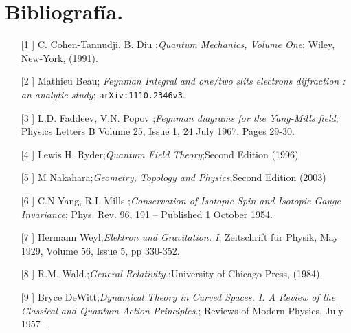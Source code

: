 \chapter{Bibliografía.}
\begin{itemize}
\item[[1]] C. Cohen-Tannudji, B. Diu ;\textit{Quantum Mechanics, Volume One}; Wiley, New-York, (1991).
\item[[2]] Mathieu Beau; \textit{Feynman Integral and one/two slits electrons diffraction : an analytic study}; \texttt{arXiv:1110.2346v3}.
\item[[3]]  L.D. Faddeev,  V.N. Popov ;\textit{Feynman diagrams for the Yang-Mills field}; Physics Letters B Volume 25, Issue 1, 24 July 1967, Pages 29-30.
\item[[4]] Lewis H. Ryder;\textit{Quantum Field Theory};Second Edition (1996) 
\item[[5]] M Nakahara;\textit{Geometry, Topology and Physics};Second Edition (2003) 
\item[[6]]  C.N Yang,  R.L Mills ;\textit{Conservation of Isotopic Spin and Isotopic Gauge Invariance}; Phys. Rev. 96, 191 – Published 1 October 1954.
\item[[7]]  Hermann Weyl;\textit{Elektron und Gravitation. I}; Zeitschrift für Physik, May 1929, Volume 56, Issue 5, pp 330-352.
\item[[8]] R.M. Wald.;\textit{General Relativity.};University of Chicago Press, (1984). 
\item[[9]]  Bryce DeWitt;\textit{Dynamical Theory in Curved Spaces. I. A Review of the Classical and Quantum Action Principles.}; Reviews of Modern Physics, July 1957 .
\end{itemize}
